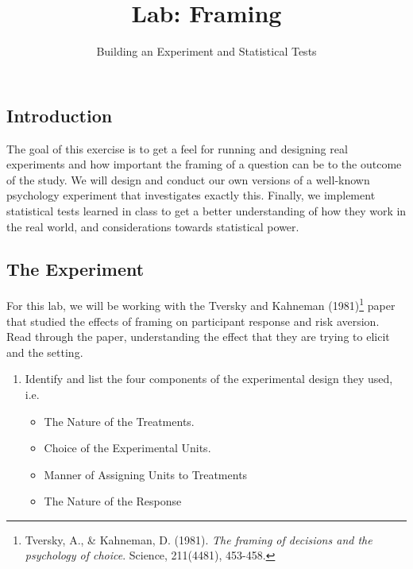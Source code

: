 \documentclass[
  letterpaper,
  DIV=11,
  numbers=noendperiod]{scrartcl}
\title{Lab: Framing}
\subtitle{Building an Experiment and Statistical Tests}
\author{}
\date{}
\begin{document}
\maketitle


\subsection{Introduction}\label{introduction}

The goal of this exercise is to get a feel for running and designing
real experiments and how important the framing of a question can be to
the outcome of the study. We will design and conduct our own versions of
a well-known psychology experiment that investigates exactly this.
Finally, we implement statistical tests learned in class to get a better
understanding of how they work in the real world, and considerations
towards statistical power.

\subsection{The Experiment}\label{the-experiment}

For this lab, we will be working with the Tversky and Kahneman
(1981)\footnote{Tversky, A., \& Kahneman, D. (1981). \emph{The framing
  of decisions and the psychology of choice}. Science, 211(4481),
  453-458.} paper that studied the effects of framing on participant
response and risk aversion. Read through the paper, understanding the
effect that they are trying to elicit and the setting.

\begin{enumerate}
\def\labelenumi{\arabic{enumi}.}
\item
  Identify and list the four components of the experimental design they
  used, i.e.

  \begin{itemize}
  \item
    The Nature of the Treatments.
  \item
    Choice of the Experimental Units.
  \item
    Manner of Assigning Units to Treatments
  \item
    The Nature of the Response
  \end{itemize}
\end{enumerate}

\hfill\break
\hfill\break
\hfill\break
\hfill\break
\hfill\break
\hfill\break
\hfill\break
\hfill\break
\hfill\break
\hfill\break
\end{document}
